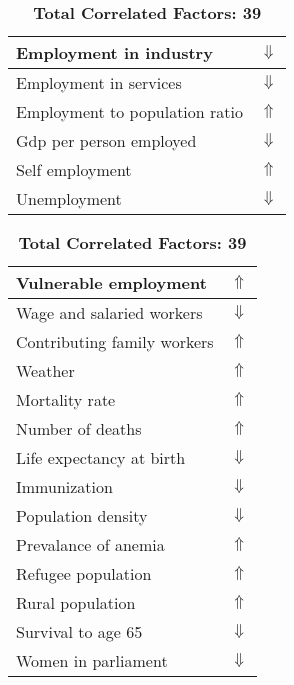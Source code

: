 \documentclass[12pt,notitlepage,oneside]{report}
\begin{document}
\begin{table}[!htb]
\begin{tabular}{|l|l|}
Employment in industry & $\Downarrow$\\ \hline
Employment in services & $\Downarrow$\\ \hline
Employment to population ratio & $\Uparrow$\\ \hline
Gdp per person employed & $\Downarrow$\\ \hline
Self employment & $\Uparrow$\\ \hline
Unemployment & $\Downarrow$\\ \hline
\end{tabular}
\begin{tabular}{|l|l|}
\hline
Vulnerable employment & $\Uparrow$\\ \hline
Wage and salaried workers & $\Downarrow$\\ \hline
Contributing family workers & $\Uparrow$\\ \hline
Weather & $\Uparrow$\\ \hline
Mortality rate & $\Uparrow$\\ \hline
Number of deaths & $\Uparrow$\\ \hline
Life expectancy at birth & $\Downarrow$\\ \hline
Immunization & $\Downarrow$\\ \hline
Population density & $\Downarrow$\\ \hline
Prevalance of anemia & $\Uparrow$\\ \hline
Refugee population & $\Uparrow$\\ \hline
Rural population & $\Uparrow$\\ \hline
Survival to age 65 & $\Downarrow$\\ \hline
Women in parliament & $\Downarrow$\\ \hline
\end{tabular}
\caption*{\textbf{Total Correlated Factors: 39}}
\end{table}
\clearpage
\end{document}
